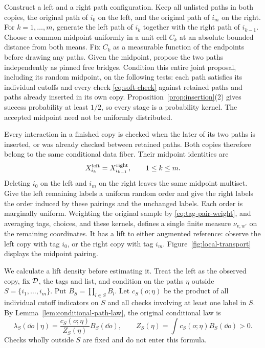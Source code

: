 Construct a left and a right path configuration.  Keep all unlisted
paths in both copies, the original path of $i_0$ on the left, and the
original path of $i_m$ on the right.  For $k=1,\ldots,m$, generate
the left path of $i_k$ together with the right path of $i_{k-1}$.
Choose a common midpoint uniformly in a unit cell $C_k$ at an absolute
bounded distance from both means.  Fix $C_k$ as a measurable function
of the endpoints before drawing any paths.  Given the midpoint,
propose the two paths independently as pinned free bridges.  Condition
this entire joint proposal, including its random midpoint, on the
following tests: each path satisfies its
individual cutoffs and every check \eqref{eq:soft-check} against
retained paths and paths already inserted in its own copy.
Proposition~\ref{prop:insertion}(2) gives success probability at least
$1/2$, so every stage is a probability kernel.  The accepted midpoint
need not be uniformly distributed.

Every interaction in a finished copy is checked when the later of its
two paths is inserted, or was already checked between retained paths.
Both copies therefore belong to the same conditional data fiber.
Their midpoint identities are
\[
                X_{i_k}^{\rm left}=X_{i_{k-1}}^{\rm right},
                         \qquad 1\le k\le m.
\]
Deleting $i_0$ on the left and $i_m$ on the right leaves the same
midpoint multiset.  Give the left remaining labels a uniform random
order and give the right labels the order induced by these pairings
and the unchanged labels.  Each order is marginally uniform.
Weighting the original sample by \eqref{eq:tag-pair-weight}, and
averaging tags, choices, and these kernels, defines a single finite
measure $\nu_{v,w'}$ on the remaining coordinates.  It has a lift to
either augmented reference: observe the left copy with tag $i_0$, or
the right copy with tag $i_m$.
Figure~\ref{fig:local-transport} displays the midpoint pairing.



We calculate a lift density before estimating it.  Treat the left as
the observed copy, fix $\mathcal D$, the tags and list, and condition on the
paths $\eta$ outside
$S=\{i_1,\ldots,i_m\}$.  Put $B_S=\prod_{l\in S}B_l$.  Let
$c_S(o;\eta)$ be the product of all individual cutoff indicators on
$S$ and all checks involving at least one label in $S$.  By
Lemma~\ref{lem:conditional-path-law}, the original conditional law is
\begin{equation}\label{eq:local-reference}
 \lambda_S(\dd o\mid\eta)
       =\frac{c_S(o;\eta)}{Z_S(\eta)}B_S(\dd o),
 \qquad Z_S(\eta)=\int c_S(o;\eta)B_S(\dd o)>0.
\end{equation}
Checks wholly outside $S$ are fixed and do not enter this formula.


